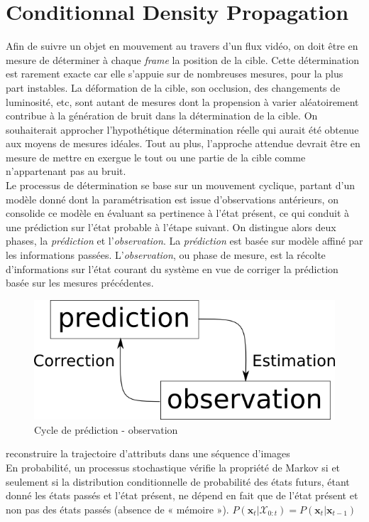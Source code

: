 \documentclass[a4paper,12pt]{report}
\begin{document}
\section{Conditionnal Density Propagation}
Afin de suivre un objet en mouvement au travers d'un flux vidéo, on doit être en mesure de déterminer à chaque \textit{frame} la position de la cible. 
Cette détermination est rarement exacte car elle s'appuie sur de nombreuses mesures, pour la plus part instables. 
La déformation de la cible, son occlusion, des changements de luminosité, etc, sont autant de mesures dont la propension à varier aléatoirement contribue à la génération de bruit dans la détermination de la cible.
On souhaiterait approcher l'hypothétique détermination réelle qui aurait été obtenue aux moyens de mesures idéales. Tout au plus, l'approche attendue devrait être en mesure de mettre en exergue le tout ou une partie de la cible comme n'appartenant pas au bruit.\\
Le processus de détermination se base sur un mouvement cyclique, partant d'un modèle donné dont la paramétrisation est issue d'observations antérieurs, on consolide ce modèle en évaluant sa pertinence à l'état présent, ce qui conduit à une prédiction sur l'état probable à l'étape suivant. 
On distingue alors deux phases, la \textit{prédiction} et l'\textit{observation}. La \textit{prédiction} est basée sur modèle affiné par les informations passées. L'\textit{observation}, ou phase de mesure, est la récolte d'informations sur l'état courant du système en vue de corriger la prédiction basée sur les mesures précédentes.\\
\begin{figure}[hbtp]
\centering
\includegraphics[scale=0.5]{figurePredictionObservationCycle.png}
\caption{Cycle de prédiction - observation}
\end{figure}

reconstruire la trajectoire d'attributs dans une séquence d'images \\
En probabilité, un processus stochastique vérifie la propriété de Markov si et seulement si la distribution conditionnelle de probabilité des états futurs, étant donné les états passés et l'état présent, ne dépend en fait que de l'état présent et non pas des états passés (absence de « mémoire »).
$P(\mathbf{x}_{t}|\mathcal{X}_{0:t})=P(\mathbf{x}_t|\mathbf{x}_{t-1})$
\end{document}
